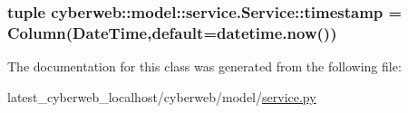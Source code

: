 \hypertarget{classcyberweb_1_1model_1_1service_1_1_service_aa637c5258fe09a8534f237413b2c561d}{
\subsubsection[{timestamp}]{\setlength{\rightskip}{0pt plus 5cm}tuple {\bf cyberweb\-::model\-::service.\-Service\-::timestamp} = \-Column(\-Date\-Time,default=datetime.\-now())}}\label{classcyberweb_1_1model_1_1service_1_1_service_aa637c5258fe09a8534f237413b2c561d}


\-The documentation for this class was generated from the following file\-:\begin{DoxyCompactItemize}
\item 
latest\-\_\-cyberweb\-\_\-localhost/cyberweb/model/\hyperlink{model_2service_8py}{service.\-py}\end{DoxyCompactItemize}

